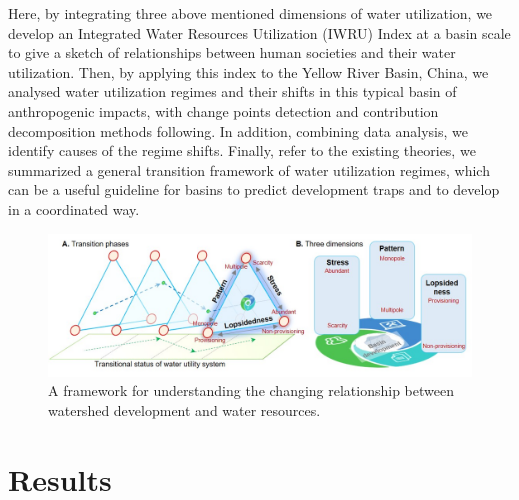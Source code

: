 \documentclass[9pt, twocolumn, twoside, lineno]{pnas-new}
\begin{document}
Here, by integrating three above mentioned dimensions of water utilization, we develop an Integrated Water Resources Utilization (IWRU) Index at a basin scale to give a sketch of relationships between human societies and their water utilization.
Then, by applying this index to the Yellow River Basin, China, we analysed water utilization regimes and their shifts in this typical basin of anthropogenic impacts, with change points detection and contribution decomposition methods following.
In addition, combining data analysis, we identify causes of the regime shifts. 
Finally, refer to the existing theories, we summarized a general transition framework of water utilization regimes, which can be a useful guideline for basins to predict development traps and to develop in a coordinated way.


\begin{figure}%
	\centering
	\includegraphics[width=\linewidth]{../../figures/main_text/framework1.jpg}
	\caption{
		A framework for understanding the changing relationship between watershed development and water resources.
	}
	\label{fig:framework1}
\end{figure}


\section*{Results}
\end{document}
